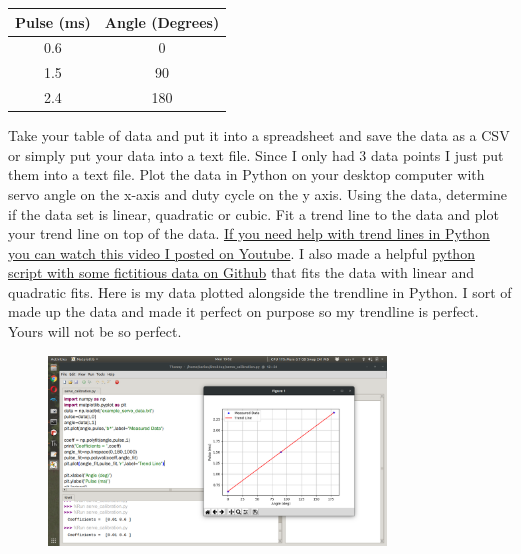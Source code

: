\begin{table}[H]
\begin{center}
\begin{tabular}{|c|c|}
\hline
Pulse (ms) & Angle (Degrees) \\
\hline
0.6 & 0 \\
\hline
1.5 & 90 \\
\hline
2.4 & 180 \\
\hline
\end{tabular}
\end{center}
\end{table}

Take your table of data and put it into a spreadsheet and save the data as a CSV or simply put your data into a text file. Since I only had 3 data points I just put them into a text file. Plot the data in Python on your desktop computer with servo angle on the x-axis and duty cycle on the y axis. Using the data, determine if the data set is linear, quadratic or cubic. Fit a trend line to the data and plot your trend line on top of the data. \href{https://www.youtube.com/watch?v=4vYYPHRMdqM&feature=youtu.be}{If you need help with trend lines in Python you can watch this video I posted on Youtube}. I also made a helpful \href{https://github.com/cmontalvo251/Python/blob/master/instrumentation/book_problems/least_squares_regression.py}{python script with some fictitious data on Github} that fits the data with linear and quadratic fits. Here is my data plotted alongside the trendline in Python. I sort of made up the data and made it perfect on purpose so my trendline is perfect. Yours will not be so perfect.

\begin{figure}[H]
  \begin{center}
    \includegraphics[width=0.8\textwidth]{Figures/trendline.png}
  \end{center}
\end{figure}


